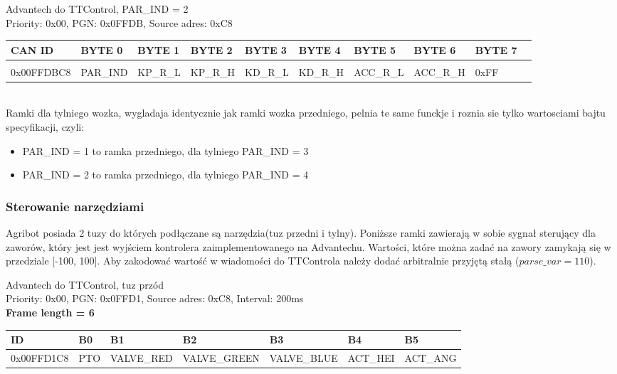 \documentclass{article}
\begin{document}
Advantech do TTControl, PAR\_IND  = 2\\
Priority: 0x00, PGN: 0x0FFDB, Source adres: 0xC8 \\
\begin{left}
\begin{tabular}{ |p{2cm}|p{1.35cm}|p{1.2cm}|p{1.50cm}|p{1.50cm}|p{1.35cm}|p{1.4cm}|p{1.4cm}|p{1.35cm}|p{1.35cm}|} 
 \hline
 CAN ID & BYTE 0 & BYTE 1 & BYTE 2 & BYTE 3 & BYTE 4 & BYTE 5 & BYTE 6 & BYTE 7 \\ \hline
 & & & & & & & &\\
0x00FFDBC8 & PAR\_IND & KP\_R\_L & KP\_R\_H & KD\_R\_L & KD\_R\_H & ACC\_R\_L & ACC\_R\_H & 0xFF \\
 \hline
\end{tabular}
\end{left}\\

Ramki dla tylniego wozka, wygladaja identycznie jak ramki wozka przedniego, pelnia te same funckje i roznia sie tylko wartosciami bajtu specyfikacji, czyli: 
\begin{itemize}
    \item PAR\_IND  = 1 to ramka przedniego, dla tylniego PAR\_IND  = 3
    \item PAR\_IND  = 2 to ramka przedniego, dla tylniego PAR\_IND  = 4
\end{itemize}

\subsubsection{Sterowanie narzędziami}
Agribot posiada 2 tuzy do których podłączane są narzędzia(tuz przedni i tylny). Poniższe ramki zawierają w sobie sygnał sterujący dla zaworów, który jest jest wyjściem kontrolera zaimplementowanego na Advantechu. Wartości, które można zadać na zawory zamykają się w przedziale [-100, 100]. Aby zakodować wartość w wiadomości do TTControla należy dodać arbitralnie przyjętą stałą ($parse\_var = 110$).

Advantech do TTControl, tuz przód\\
Priority: 0x00, PGN: 0x0FFD1, Source adres: 0xC8, Interval: 200ms\\
\textbf{Frame length = 6}
\begin{center}
\begin{tabular}{| p{65pt} | p{25pt} | p{70pt} | p{70pt} | p{75pt} | p{40pt} | p{40pt} |}
    \hline 
    ID & B0 & B1 & B2 & B3 & B4 & B5 \\ 
    \hline
    0x00FFD1C8 & PTO & VALVE\_RED & VALVE\_GREEN & VALVE\_BLUE & ACT\_HEI & ACT\_ANG \\
    \hline
\end{tabular}
\end{center}
\end{document}
